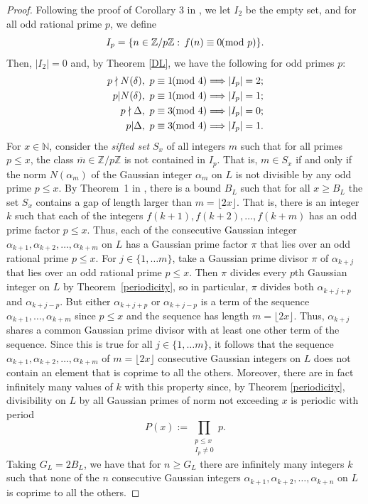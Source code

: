 \documentclass[11pt]{article}
\newcommand{\N}{\mathbb{N}}
\newcommand{\Z}{\mathbb{Z}}
\begin{document}
\begin{proof}
Following the proof of Corollary 3 in \cite{ford}, we let $I_2$ be the empty set, and for all  odd rational prime $p$, we define 
$$I_p=\{n\in\Z/p\Z:\, f(n)\equiv 0\hskip-.07in\pmod p\}.$$
Then, $\left| I_2\right|=0$ and, by Theorem \ref{DL}, we have the following  for odd primes $p$:
\begin{align*}p\nmid N(\delta),  \ p\equiv 1\hskip-.07in\pmod 4&\Longrightarrow \left| I_p\right|=2;\\
p| N(\delta),  \ p\equiv 1\hskip-.07in\pmod 4&\Longrightarrow\left| I_p\right|=1;\\
p\nmid \Delta,  \ p\equiv 3\hskip-.07in\pmod 4&\Longrightarrow \left| I_p\right|=0;\\
p| \Delta,  \ p\equiv 3\hskip-.07in\pmod 4&\Longrightarrow\left| I_p\right|=1.
\end{align*}
For $x\in\N$, consider the {\it sifted set} 
$S_x$
of all  integers $m$ such that for all primes $p\leq x$, the class $\overline{m}\in\Z/p\Z$ is not contained in $I_p$.  That is, $m\in S_x$ if  and only if the norm $N(\alpha_m)$ of the Gaussian integer $\alpha_m$ on $L$ is not divisible by any odd prime $p\leq x$.  
By Theorem~1 in \cite{ford}, there is a bound $B_L$ such that for all $x\geq B_L$ the set $S_x$ contains a gap of length larger than $m=\lfloor{2x}\rfloor$. That is, there is an integer $k$ such that each of the integers $f(k+1), f(k+2),\ldots, f(k+m)$ has an odd prime factor $p\leq x$. Thus, each of the consecutive Gaussian integer $\alpha_{k+1},\alpha_{k+2}, \ldots,\alpha_{k+m}$ on $L$ has a  Gaussian prime factor $\pi$ that lies over an odd rational prime $p\leq x$.  For $j\in\{1, \ldots m\}$, take a Gaussian prime divisor $\pi$ of $\alpha_{k+j}$ that lies over an odd rational prime $p\leq x$. Then $\pi$ divides every $p$th Gaussian integer on $L$ by Theorem~\ref{periodicity}, so in particular, $\pi$ divides both  $\alpha_{k+j+p}$ and $\alpha_{k+j-p}$. But either $\alpha_{k+j+p}$ or $\alpha_{k+j-p}$ is a term of the sequence $\alpha_{k+1},\ldots,\alpha_{k+m}$ since $p\leq x$ and the sequence  has length $m=\lfloor{2x}\rfloor$.  Thus, $\alpha_{k+j}$ shares a common Gaussian prime divisor with at least one other term of the sequence. Since this is true for all $j\in\{1, \ldots m\}$, it follows that the sequence $\alpha_{k+1}, \alpha_{k+2},\ldots, \alpha_{k+m}$ of $m=\lfloor{2x}\rfloor$ consecutive Gaussian integers on $L$ does not contain an element that is coprime to all the others.  
Moreover, there are in fact infinitely many values of $k$ with this property since, by Theorem \ref{periodicity}, divisibility on $L$ by all Gaussian primes of norm not exceeding $x$ is periodic with period 
$$P(x):=\prod_{\substack{p\leq x \\ I_p\neq 0}}p.$$
Taking $G_L=2B_L$, we have that for $n\geq G_L$ there are infinitely many integers $k$ such that none of the $n$ consecutive Gaussian integers $\alpha_{k+1}, \alpha_{k+2},\ldots, \alpha_{k+n}$ on $L$ is coprime to all the others.
\end{proof}
\end{document}
